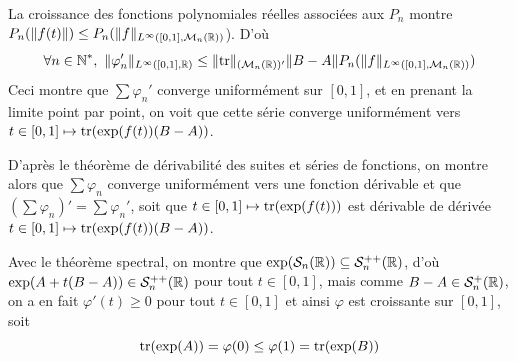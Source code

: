 \begin{solution}
\begin{enumerate}
		La croissance des fonctions polynomiales réelles associées aux $P_n$ montre $P_n({\lVert f(t)\rVert})\leq P_n(\lVert f\rVert_{L^{\infty}([0,1],\mathcal M_n(\operatorname{\mathbb R}))}$).
		D'où 
		\[
			\forall n\in\N^*,\ \norm{\varphi'_n}_{L^\infty([0,1],\R)}\leq \norm{\tr}_{(\mathcal M_n(\R))'}\norm{B-A}P_n(\norm{f}_{L^{\infty}([0,1],\mathcal M_n(\R))})
		\]
		Ceci montre que $\sum\varphi_n'$ converge uniformément sur $[0,1]$, et en prenant la limite point par point,
		on voit que cette série converge uniformément vers $t\in[0,1]\mapsto\operatorname{tr}(\exp(f(t))(B-A))$.

		D'après le théorème de dérivabilité des suites et séries de fonctions, on montre alors que $\sum\varphi_n$ converge uniformément vers une fonction dérivable 
		et que $(\sum\varphi_n)'=\sum\varphi_n'$, soit que $t\in[0,1]\mapsto\operatorname{tr}(\exp(f(t)))$ est dérivable de dérivée $t\in[0,1]\mapsto \operatorname{tr}(\exp(f(t))(B-A))$.

		Avec le théorème spectral, on montre que $\exp(\mathcal S_n(\operatorname{\mathbb R}))\subseteq \mathcal S_n^{++}(\operatorname{\mathbb R})$, d'où $\exp(A+t(B-A))\in\mathcal S_n^{++}(\operatorname{\mathbb R})$ pour tout $t\in[0,1]$,
		mais comme $B-A\in\mathcal S_n^+(\operatorname{\mathbb R})$, on a en fait $\varphi'(t)\geq 0$ pour tout $t\in[0,1]$ et ainsi $\varphi$ est croissante sur $[0,1]$, soit 
		\[
			\operatorname{tr}(\exp(A))=\varphi(0)\leq\varphi(1)=\operatorname{tr}(\exp(B))	
		\]
	\end{enumerate}
\end{solution}